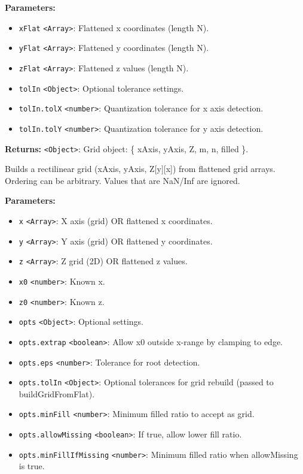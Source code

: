 \documentclass[12pt,a4paper]{article}
\begin{document}
\noindent \textbf{Parameters:}
\begin{itemize}
  \item \texttt{xFlat} \texttt{<Array>}: Flattened x coordinates (length N).
  \item \texttt{yFlat} \texttt{<Array>}: Flattened y coordinates (length N).
  \item \texttt{zFlat} \texttt{<Array>}: Flattened z values (length N).
  \item \texttt{tolIn} \texttt{<Object>}: Optional tolerance settings.
  \item \texttt{tolIn.tolX} \texttt{<number>}: Quantization tolerance for x axis detection.
  \item \texttt{tolIn.tolY} \texttt{<number>}: Quantization tolerance for y axis detection.
\end{itemize}

\noindent \textbf{Returns:} \texttt{<Object>}: Grid object: \{ xAxis, yAxis, Z, m, n, filled \}.

\noindent Builds a rectilinear grid (xAxis, yAxis, Z[y][x]) from flattened grid arrays.
Ordering can be arbitrary. Values that are NaN/Inf are ignored.

\vspace{5mm}
\noindent {}


\noindent \textbf{Parameters:}
\begin{itemize}
  \item \texttt{x} \texttt{<Array>}: X axis (grid) OR flattened x coordinates.
  \item \texttt{y} \texttt{<Array>}: Y axis (grid) OR flattened y coordinates.
  \item \texttt{z} \texttt{<Array>}: Z grid (2D) OR flattened z values.
  \item \texttt{x0} \texttt{<number>}: Known x.
  \item \texttt{z0} \texttt{<number>}: Known z.
  \item \texttt{opts} \texttt{<Object>}: Optional settings.
  \item \texttt{opts.extrap} \texttt{<boolean>}: Allow x0 outside x-range by clamping to edge.
  \item \texttt{opts.eps} \texttt{<number>}: Tolerance for root detection.
  \item \texttt{opts.tolIn} \texttt{<Object>}: Optional tolerances for grid rebuild (passed to buildGridFromFlat).
  \item \texttt{opts.minFill} \texttt{<number>}: Minimum filled ratio to accept as grid.
  \item \texttt{opts.allowMissing} \texttt{<boolean>}: If true, allow lower fill ratio.
  \item \texttt{opts.minFillIfMissing} \texttt{<number>}: Minimum filled ratio when allowMissing is true.
\end{itemize}
\end{document}
